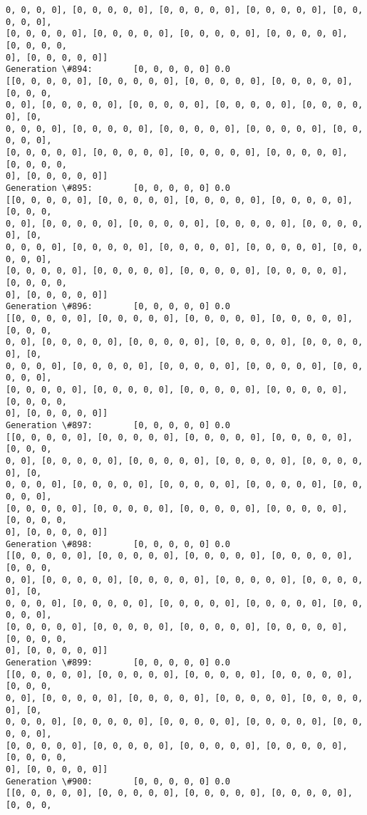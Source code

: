 \documentclass[11pt]{article}
\begin{document}
\begin{Verbatim}[commandchars=\\\{\}]
0, 0, 0, 0], [0, 0, 0, 0, 0], [0, 0, 0, 0, 0], [0, 0, 0, 0, 0], [0, 0, 0, 0, 0],
[0, 0, 0, 0, 0], [0, 0, 0, 0, 0], [0, 0, 0, 0, 0], [0, 0, 0, 0, 0], [0, 0, 0, 0,
0], [0, 0, 0, 0, 0]]
Generation \#894:        [0, 0, 0, 0, 0] 0.0
[[0, 0, 0, 0, 0], [0, 0, 0, 0, 0], [0, 0, 0, 0, 0], [0, 0, 0, 0, 0], [0, 0, 0,
0, 0], [0, 0, 0, 0, 0], [0, 0, 0, 0, 0], [0, 0, 0, 0, 0], [0, 0, 0, 0, 0], [0,
0, 0, 0, 0], [0, 0, 0, 0, 0], [0, 0, 0, 0, 0], [0, 0, 0, 0, 0], [0, 0, 0, 0, 0],
[0, 0, 0, 0, 0], [0, 0, 0, 0, 0], [0, 0, 0, 0, 0], [0, 0, 0, 0, 0], [0, 0, 0, 0,
0], [0, 0, 0, 0, 0]]
Generation \#895:        [0, 0, 0, 0, 0] 0.0
[[0, 0, 0, 0, 0], [0, 0, 0, 0, 0], [0, 0, 0, 0, 0], [0, 0, 0, 0, 0], [0, 0, 0,
0, 0], [0, 0, 0, 0, 0], [0, 0, 0, 0, 0], [0, 0, 0, 0, 0], [0, 0, 0, 0, 0], [0,
0, 0, 0, 0], [0, 0, 0, 0, 0], [0, 0, 0, 0, 0], [0, 0, 0, 0, 0], [0, 0, 0, 0, 0],
[0, 0, 0, 0, 0], [0, 0, 0, 0, 0], [0, 0, 0, 0, 0], [0, 0, 0, 0, 0], [0, 0, 0, 0,
0], [0, 0, 0, 0, 0]]
Generation \#896:        [0, 0, 0, 0, 0] 0.0
[[0, 0, 0, 0, 0], [0, 0, 0, 0, 0], [0, 0, 0, 0, 0], [0, 0, 0, 0, 0], [0, 0, 0,
0, 0], [0, 0, 0, 0, 0], [0, 0, 0, 0, 0], [0, 0, 0, 0, 0], [0, 0, 0, 0, 0], [0,
0, 0, 0, 0], [0, 0, 0, 0, 0], [0, 0, 0, 0, 0], [0, 0, 0, 0, 0], [0, 0, 0, 0, 0],
[0, 0, 0, 0, 0], [0, 0, 0, 0, 0], [0, 0, 0, 0, 0], [0, 0, 0, 0, 0], [0, 0, 0, 0,
0], [0, 0, 0, 0, 0]]
Generation \#897:        [0, 0, 0, 0, 0] 0.0
[[0, 0, 0, 0, 0], [0, 0, 0, 0, 0], [0, 0, 0, 0, 0], [0, 0, 0, 0, 0], [0, 0, 0,
0, 0], [0, 0, 0, 0, 0], [0, 0, 0, 0, 0], [0, 0, 0, 0, 0], [0, 0, 0, 0, 0], [0,
0, 0, 0, 0], [0, 0, 0, 0, 0], [0, 0, 0, 0, 0], [0, 0, 0, 0, 0], [0, 0, 0, 0, 0],
[0, 0, 0, 0, 0], [0, 0, 0, 0, 0], [0, 0, 0, 0, 0], [0, 0, 0, 0, 0], [0, 0, 0, 0,
0], [0, 0, 0, 0, 0]]
Generation \#898:        [0, 0, 0, 0, 0] 0.0
[[0, 0, 0, 0, 0], [0, 0, 0, 0, 0], [0, 0, 0, 0, 0], [0, 0, 0, 0, 0], [0, 0, 0,
0, 0], [0, 0, 0, 0, 0], [0, 0, 0, 0, 0], [0, 0, 0, 0, 0], [0, 0, 0, 0, 0], [0,
0, 0, 0, 0], [0, 0, 0, 0, 0], [0, 0, 0, 0, 0], [0, 0, 0, 0, 0], [0, 0, 0, 0, 0],
[0, 0, 0, 0, 0], [0, 0, 0, 0, 0], [0, 0, 0, 0, 0], [0, 0, 0, 0, 0], [0, 0, 0, 0,
0], [0, 0, 0, 0, 0]]
Generation \#899:        [0, 0, 0, 0, 0] 0.0
[[0, 0, 0, 0, 0], [0, 0, 0, 0, 0], [0, 0, 0, 0, 0], [0, 0, 0, 0, 0], [0, 0, 0,
0, 0], [0, 0, 0, 0, 0], [0, 0, 0, 0, 0], [0, 0, 0, 0, 0], [0, 0, 0, 0, 0], [0,
0, 0, 0, 0], [0, 0, 0, 0, 0], [0, 0, 0, 0, 0], [0, 0, 0, 0, 0], [0, 0, 0, 0, 0],
[0, 0, 0, 0, 0], [0, 0, 0, 0, 0], [0, 0, 0, 0, 0], [0, 0, 0, 0, 0], [0, 0, 0, 0,
0], [0, 0, 0, 0, 0]]
Generation \#900:        [0, 0, 0, 0, 0] 0.0
[[0, 0, 0, 0, 0], [0, 0, 0, 0, 0], [0, 0, 0, 0, 0], [0, 0, 0, 0, 0], [0, 0, 0,

\end{Verbatim}
\end{document}
